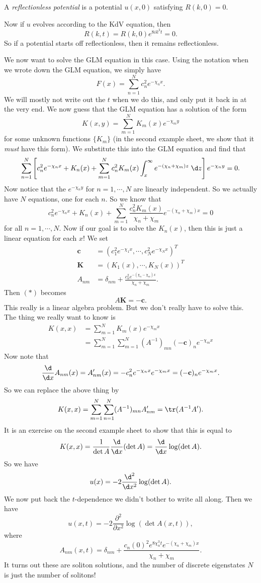 \documentclass[a4paper]{article}
\begin{document}
\begin{defi}
  A \emph{reflectionless potential} is a potential $u(x, 0)$ satisfying $R(k, 0) = 0$.
\end{defi}

Now if $u$ evolves according to the KdV equation, then
\[
  R(k, t) = R(k, 0) e^{8ik^3 t} = 0.
\]
So if a potential starts off reflectionless, then it remains reflectionless.

We now want to solve the GLM equation in this case. Using the notation when we wrote down the GLM equation, we simply have
\[
  F(x) = \sum_{n = 1}^N c_n^2 e^{-\chi_n x}.
\]
We will mostly not write out the $t$ when we do this, and only put it back in at the very end. We now guess that the GLM equation has a solution of the form
\[
  K(x, y) = \sum_{m = 1}^N K_m(x) e^{-\chi_m y}
\]
for some unknown functions $\{K_m\}$ (in the second example sheet, we show that it \emph{must} have this form). We substitute this into the GLM equation and find that
\[
  \sum_{n = 1}^N \left[c_n^2 e^{-\chi_n x}+ K_n(x) + \sum_{m = 1}^N c_n^2 K_m(x) \int_x^\infty e^{-(\chi_n + \chi_m)z}\;\d z\right] e^{-\chi_n y} = 0.
\]
Now notice that the $e^{-\chi_n y}$ for $n = 1, \cdots, N$ are linearly independent. So we actually have $N$ equations, one for each $n$. So we know that
\[
  c_n^2 e^{-\chi_n x} + K_n(x) + \sum_{m = 1}^N \frac{c_n^2 K_m(x)}{\chi_n + \chi_m} e^{-(\chi_n + \chi_m)x} = 0\tag{$*$}
\]
for all $n = 1, \cdots, N$. Now if our goal is to solve the $K_n(x)$, then this is just a linear equation for each $x$! We set
\begin{align*}
  \mathbf{c} &= (c_1^2 e^{-\chi_1 x}, \cdots, c_N^2 e^{-\chi_N x})^T\\
  \mathbf{K} &= (K_1(x), \cdots, K_N(x))^T\\
  A_{nm} &= \delta_{nm} + \frac{c_n^2 e^{-(\chi_n - \chi_m)x}}{\chi_n + \chi_m}.
\end{align*}
Then $(*)$ becomes
\[
  A\mathbf{K} = -\mathbf{c}.
\]
This really is a linear algebra problem. But we don't really have to solve this. The thing we really want to know is
\begin{align*}
  K(x, x) &= \sum_{m = 1}^N K_m(x) e^{-\chi_m x}\\
  &= \sum_{m = 1}^N \sum_{m = 1}^N (A^{-1})_{mn} (-\mathbf{c})_n e^{-\chi_m x}
\end{align*}
Now note that
\[
  \frac{\d}{\d x}A_{nm}(x) = A_{nm}'(x) = - c_n^2 e^{-\chi_n x} e^{-\chi_m x} = (-\mathbf{c})_n e^{-\chi_m x}.
\]
So we can replace the above thing by
\[
  K(x, x) = \sum_{m = 1}^N \sum_{n = 1}^N (A^{-1})_{mn} A'_{nm} = \tr(A^{-1}A').
\]
It is an exercise on the second example sheet to show that this is equal to
\[
  K(x, x) = \frac{1}{\det A} \frac{\d}{\d x} (\det A) = \frac{\d}{\d x} \log (\det A).
\]
So we have
\[
  u(x) = - 2 \frac{\d^2}{\d x^2} \log(\det A).
\]
We now put back the $t$-dependence we didn't bother to write all along. Then we have
\[
  u(x, t) = -2 \frac{\partial^2}{\partial x^2} \log(\det A(x, t)),
\]
where
\[
  A_{nm}(x, t) = \delta_{nm} + \frac{c_n(0)^2 e^{8\chi_n^3 t}e^{-(\chi_n + \chi_m)x}}{\chi_n + \chi_m}.
\]
It turns out these are soliton solutions, and the number of discrete eigenstates $N$ is just the number of solitons!
\end{document}
